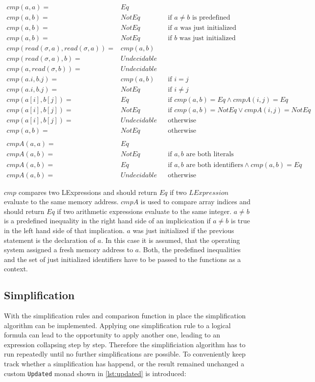\documentclass[12pt]{article}
\begin{document}
\begin{align*}
    cmp(a,a)= & Eq\\
    cmp(a,b)= & NotEq &  & \text{if }a\neq b\text{ is predefined}\\
    cmp(a,b)= & NotEq &  & \text{if }a\text{ was just initialized}\\
    cmp(a,b)= & NotEq &  & \text{if }b\text{ was just initialized}\\
    cmp(read(\sigma,a),read(\sigma,a))= & cmp(a,b)\\
    cmp(read(\sigma,a),b)= & Undecidable\\
    cmp(a,read(\sigma,b))= & Undecidable\\
    cmp(a.i,b.j)= & cmp(a,b) &  & \text{if }i=j\\
    cmp(a.i,b.j)= & NotEq &   & \text{if }i\neq j\\
    cmp(a[i],b[j])= & Eq &  & \text{if }cmp(a,b)=Eq\wedge cmpA(i,j)=Eq\\
    cmp(a[i],b[j])= & NotEq &  & \text{if }cmp(a,b)=NotEq\vee cmpA(i,j)=NotEq\\
    cmp(a[i],b[j])= & Undecidable &  & \text{otherwise}\\
    cmp(a,b)= & NotEq &  & \text{otherwise}\\
    \\
    cmpA(a,a)= & Eq\\
    cmpA(a,b)= & NotEq &  & \text{if }a,b\text{ are both literals}\\
    cmpA(a,b)= & Eq &  & \text{if }a,b\text{ are both identifiers}\wedge cmp(a,b)=Eq\\
    cmpA(a,b)= & Undecidable &  & \text{otherwise}
\end{align*}

$cmp$ compares two LExpressions and should return $Eq$ if two $LExpression$ evaluate to the same memory address.
$cmpA$ is used to compare array indices and should return $Eq$ if two arithmetic expressions evaluate to the same integer.
$a \neq b$ is a predefined inequality in the right hand side of an implicication if $a \neq b$ is true in the left hand side of that implication. 
$a$ was just initialized if the previous statement is the declaration of $a$. 
In this case it is assumed, that the operating system assigned a fresh memory address to $a$.
Both, the predefined inequalities and the set of just initialized identifiers have to be passed to the functions as a context.

\subsection{Simplification}
With the simplification rules and comparison function in place the simplification algorithm can be implemented.
Applying one simplification rule to a logical formula can lead to the opportunity to apply another one, leading to an expression collapsing step by step.
Therefore the simplificiation algorithm has to run repeatedly until no further simplifications are possible.
To conveniently keep track whether a simplification has happend, or the result remained unchanged a custom \texttt{Updated} monad shown in \ref{lst:updated} is introduced:
\end{document}
